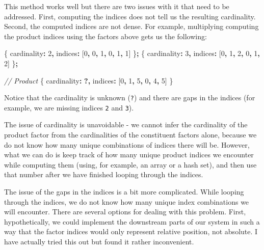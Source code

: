 \documentclass[
]{book}
\newenvironment{Shaded}{\begin{snugshade}}{\end{snugshade}}
\newcommand{\CommentTok}[1]{\textcolor[rgb]{0.56,0.35,0.01}{\textit{#1}}}
\newcommand{\DecValTok}[1]{\textcolor[rgb]{0.00,0.00,0.81}{#1}}
\newcommand{\NormalTok}[1]{#1}
\newcommand{\OperatorTok}[1]{\textcolor[rgb]{0.81,0.36,0.00}{\textbf{#1}}}
\theoremstyle{definition}
\theoremstyle{definition}
\theoremstyle{definition}
\theoremstyle{definition}
\theoremstyle{remark}
\begin{document}
This method works well but there are two issues with it that need to be addressed. First, computing the indices does not tell us the resulting cardinality. Second, the computed indices are not dense. For example, multiplying computing the product indices using the factors above gets us the following:

\begin{Shaded}
\begin{Highlighting}[]
\NormalTok{\{ cardinality}\OperatorTok{:} \DecValTok{2}\OperatorTok{,}\NormalTok{ indices}\OperatorTok{:}\NormalTok{ [}\DecValTok{0}\OperatorTok{,} \DecValTok{0}\OperatorTok{,} \DecValTok{1}\OperatorTok{,} \DecValTok{0}\OperatorTok{,} \DecValTok{1}\OperatorTok{,} \DecValTok{1}\NormalTok{] \}}\OperatorTok{;}
\NormalTok{\{ cardinality}\OperatorTok{:} \DecValTok{3}\OperatorTok{,}\NormalTok{ indices}\OperatorTok{:}\NormalTok{ [}\DecValTok{0}\OperatorTok{,} \DecValTok{1}\OperatorTok{,} \DecValTok{2}\OperatorTok{,} \DecValTok{0}\OperatorTok{,} \DecValTok{1}\OperatorTok{,} \DecValTok{2}\NormalTok{] \}}\OperatorTok{;}

\CommentTok{// Product}
\NormalTok{\{ cardinality}\OperatorTok{:} \OperatorTok{?,}\NormalTok{ indices}\OperatorTok{:}\NormalTok{ [}\DecValTok{0}\OperatorTok{,} \DecValTok{1}\OperatorTok{,} \DecValTok{5}\OperatorTok{,} \DecValTok{0}\OperatorTok{,} \DecValTok{4}\OperatorTok{,} \DecValTok{5}\NormalTok{] \}}
\end{Highlighting}
\end{Shaded}

Notice that the cardinality is unknown (\texttt{?}) and there are gaps in the indices (for example, we are missing indices \texttt{2} and \texttt{3}).

The issue of cardinality is unavoidable - we cannot infer the cardinality of the product factor from the cardinalities of the constituent factors alone, because we do not know how many unique combinations of indices there will be. However, what we can do is keep track of how many unique product indices we encounter while computing them (using, for example, an array or a hash set), and then use that number after we have finished looping through the indices.

The issue of the gaps in the indices is a bit more complicated. While looping through the indices, we do not know how many unique index combinations we will encounter. There are several options for dealing with this problem. First, hypothetically, we could implement the downstream parts of our system in such a way that the factor indices would only represent relative position, not absolute. I have actually tried this out but found it rather inconvenient.
\end{document}

